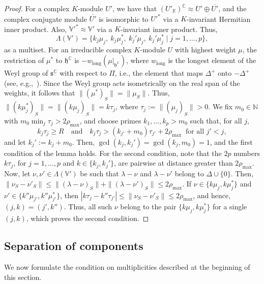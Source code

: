 \documentclass{article}
\newcommand{\N}{\mathbb{N}}
\newcommand{\R}{\mathbb{R}}
\newcommand{\C}{\mathbb{C}}
\newcommand{\fraks}{\mathfrak{s}}
\newcommand{\frakh}{\mathfrak{h}}
\newcommand{\xc}[1]{\vspace{.1cm}
\noindent {\em #1} }
\theoremstyle{definition}
\theoremstyle{plain}
\begin{document}
\begin{proof}
\xc{Step~3: the weights.}
For a complex $K$-module $U'$, we have that $(U'_\R)^\C\approx U'\oplus\overline{U'}$, and the complex conjugate module $\overline{U'}$ is isomorphic to $U'^*$ via a $K$-invariant Hermitian inner product. Also, $\mathbb V'^*\approx \mathbb V'$ via a $K$-invariant inner product. Thus,
$$
\Lambda(\mathbb V')=\{k_j\mu_j,\ k_j\mu_j^*,\ k_j'\mu_j,\ k_j'\mu_j^*\mid j=1,\ldots,p\},
$$
as a multiset.
For an irreducible complex $K$-module $U$ with highest weight $\mu$, the restriction of $\mu^*$ to $\frakh^\C$ is $-w_{\mathrm{long}}(\mu|_{\frakh^\C})$, where $w_{\mathrm{long}}$ is the longest element of the Weyl group of $\fraks^\C$ with respect to $\Pi$, i.e., the element that maps $\Delta^+$ onto $-\Delta^+$ (see, e.g.,~\cite[Exercise~21.6]{HumphreysLie}).
Since the Weyl group acts isometrically on the real span of the weights, it follows that $\|(\mu^*)_S\|=\|\mu_S\|$.
Thus, $\|(k\mu_j^*)_S\|=\|(k\mu_j)_S\|=k\tau_j$, where $\tau_j:=\|(\mu_j)_S\|>0$.
We fix $m_0\in\N$ with $m_0\min_j\tau_j>2\rho_{\max}$, and choose primes $k_1,\ldots,k_p>m_0$ such that, for all $j$,
$$
    k_j\tau_j\geq R
    \quad\mbox{and}\quad
    k_j\tau_j>(k_{j'}+m_0)\tau_{j'}+2\rho_{\max}\ \mbox{ for all } j'<j,
$$
and let $k_j':=k_j+m_0$. Then, $\gcd(k_j,k_j')=\gcd(k_j,m_0)=1$, and the first condition of the lemma holds.
For the second condition, note that the $2p$ numbers $k\tau_j$, for $j=1,\ldots,p$ and $k\in\{k_j,k_j'\}$, are pairwise at distance greater than $2\rho_{\max}$.
Now, let $\nu,\nu'\in\Lambda(\mathbb V')$ be such that $\lambda-\nu$ and $\lambda-\nu'$ belong to $\Delta\cup\{0\}$. Then,
    $\|\nu_S-\nu'_S\|\leq\|(\lambda-\nu)_S\|+\|(\lambda-\nu')_S\|\leq2\rho_{\max}$.
If $\nu\in\{k\mu_j,k\mu_j^*\}$ and $\nu'\in\{k''\mu_{j'},k''\mu_{j'}^*\}$, then $|k\tau_j-k''\tau_{j'}|\leq\|\nu_S-\nu'_S\|\leq2\rho_{\max}$, and hence, $(j,k)=(j',k'')$.
Thus, all such $\nu$ belong to the pair $\{k\mu_j,k\mu_j^*\}$ for a single $(j,k)$, which proves the second condition.
\end{proof}



\subsection{Separation of components}\label{ssec:separation}

We now formulate the condition on multiplicities described at the beginning of this section.
\end{document}
